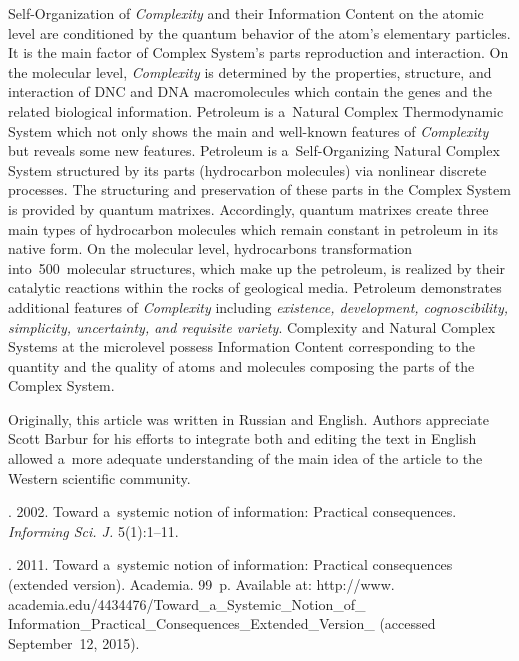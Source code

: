 \begin{multicols}{2}
Self-Organization of \textit{Complexity} and their Information Content on the atomic level are 
conditioned by the quantum behavior of the atom's elementary particles. It is the main factor of 
Complex System's parts reproduction and interaction. On the molecular level, \textit{Complexity} 
is determined by the properties, structure, and interaction of DNC and DNA macromolecules 
which contain the genes and the related biological information. Petroleum is a~Natural Complex 
Thermodynamic System which not only shows the main and well-known features of 
\textit{Complexity} but reveals some new features. Petroleum is a~Self-Organizing Natural 
Complex System structured by its parts (hydrocarbon molecules) via nonlinear discrete 
processes. The structuring and preservation of these parts in the Complex System is provided by 
quantum matrixes. Accordingly, quantum matrixes create three main types of hydrocarbon 
molecules which remain constant in petroleum in its native form. On the molecular level, 
hydrocarbons transformation into~500~molecular structures, which make up the petroleum, is 
realized by their catalytic reactions within the rocks of geological media. Petroleum demonstrates 
additional features of \textit{Complexity} including \textit{existence, development, 
cognoscibility, simplicity, uncertainty, and requisite variety}. Complexity and Natural Complex 
Systems at the microlevel possess Information Content corresponding to the quantity and the 
quality of atoms and molecules composing the parts of the Complex System.             
      
\Ack
\noindent
Originally, this article was written in Russian and English. Authors appreciate Scott Barbur for 
his efforts to integrate both and editing the text in English allowed a~more adequate 
understanding of the main idea of the article  to the Western scientific community.

\renewcommand{\bibname}{\protect\rmfamily References}


{\small\frenchspacing
{%
\begin{thebibliography}{99}

. 2002. Toward a~systemic notion of information: Practical 
consequences. \textit{Informing Sci. J.} 5(1):1--11. 

. 2011. Toward a~systemic notion of information: Practical 
consequences (extended version). Academia. 99~p. Available at: {\sf 
http://www. academia.edu/4434476/Toward\_a\_Systemic\_Notion\_of\_ Information\_Practical\_Consequences\_Extended\_Version\_} (accessed September~12, 2015). 


\end{thebibliography}}}
\end{multicols}
